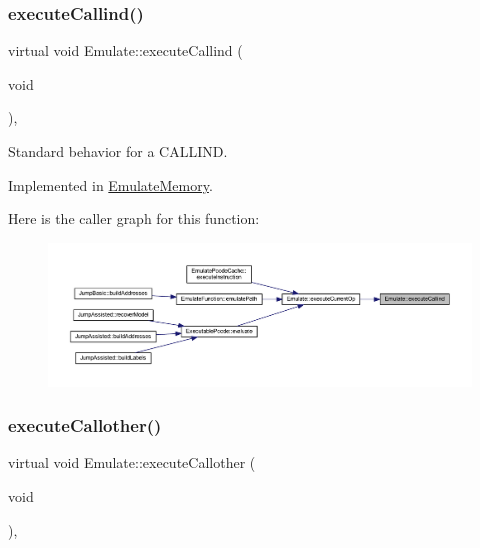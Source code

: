 \subsubsection{\texorpdfstring{executeCallind()}{executeCallind()}}
{\footnotesize\ttfamily virtual void Emulate\+::execute\+Callind (\begin{DoxyParamCaption}\item[{void}]{ }\end{DoxyParamCaption})\hspace{0.3cm}{\ttfamily [protected]}, {}}



Standard behavior for a C\+A\+L\+L\+I\+ND. 



Implemented in \mbox{\hyperlink{class_emulate_memory_af1c25ebc29e2e57ab762d878ac8103e4}{Emulate\+Memory}}.

Here is the caller graph for this function\+:
\nopagebreak
\begin{figure}[H]
\begin{center}
\leavevmode
\includegraphics[width=350pt]{class_emulate_aa3579bd388004b72fab0e62175aeb1a0_icgraph}
\end{center}
\end{figure}
\mbox{\label{class_emulate_ab60a8c9f009c0ce388bb2b6eef50a50b}} 
\subsubsection{\texorpdfstring{executeCallother()}{executeCallother()}}
{\footnotesize\ttfamily virtual void Emulate\+::execute\+Callother (\begin{DoxyParamCaption}\item[{void}]{ }\end{DoxyParamCaption})\hspace{0.3cm}{\ttfamily [protected]}, {}}



